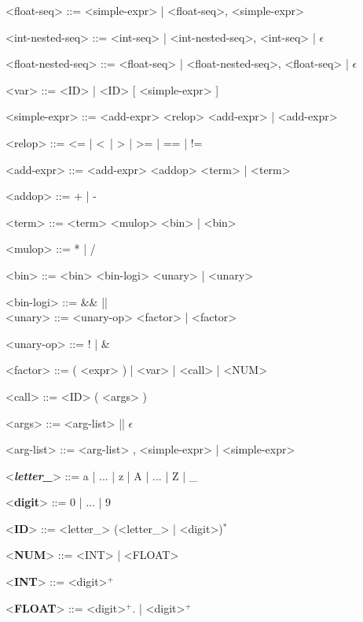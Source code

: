 \begin{grammar}
	<float-seq> ::= <simple-expr> | <float-seq>, <simple-expr>
	
	<int-nested-seq> ::= <int-seq> | <int-nested-seq>, <int-seq> | $\epsilon$
	
	<float-nested-seq> ::= <float-seq> | <float-nested-seq>, <float-seq> | $\epsilon$
	
	<var> ::= <ID> | <ID> [ <simple-expr> ]
	
	<simple-expr> ::= <add-expr> <relop> <add-expr> | <add-expr>
	
	<relop> ::= \textless= | \textless\ | > | >= | == | !=
	
	<add-expr> ::= <add-expr> <addop> <term> | <term>
	
	<addop> ::= + | - 
	
	<term> ::= <term> <mulop> <bin> | <bin>
	
	<mulop> ::= * | / 
	
	<bin> ::= <bin> <bin-logi> <unary> | <unary>
	
	<bin-logi> ::= \&\& \alt || \alt \^ \\
	
	<unary> ::= <unary-op> <factor> | <factor> 
	
	<unary-op> ::= ! | \&
	
	<factor> ::= ( <expr> ) | <var> | <call> | <NUM>
	
	<call> ::= <ID> ( <args> ) 
	
	<args> ::= <arg-list> || $\epsilon$
	
	<arg-list> ::= <arg-list> , <simple-expr> | <simple-expr>
	
	<\textbf{\textit{letter\_}}> ::= a | ... | z | A | ... | Z | \_
	
	<\textbf{digit}> ::= 0 | ... | 9
	
	<\textbf{ID}> ::= <letter\_> (<letter\_> | <digit>)$^*$
	
	<\textbf{NUM}> ::= <INT> | <FLOAT>
	
	<\textbf{INT}> ::= <digit>$^+$
	
	<\textbf{FLOAT}> ::= <digit>$^+$. | <digit>$^+$
	
\end{grammar}
